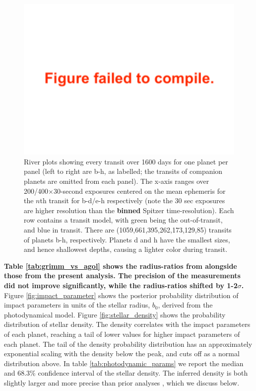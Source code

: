 \documentclass[twocolumn]{aastex63}
\begin{document}
\begin{figure}
    \centering
    \includegraphics[width=\hsize]{figures/T1_riverplot.pdf}
    {River plots showing every transit over 1600 days for one planet per panel
        (left to right are b-h, as labelled; the
        transits of companion planets are omitted from each panel).
        The x-axis ranges over 200/400${\times}$30-second exposures centered on the mean ephemeris for the $n$th transit
        for b-d/e-h respectively (note the 30 sec exposures are higher resolution than the \textbf{binned} Spitzer time-resolution).
        Each row contains a transit model, with green being the out-of-transit, and blue in
        transit.  There are (1059,661,395,262,173,129,85) transits of planets b-h, respectively.
        Planets d and h have the smallest sizes, and hence shallowest depths, causing a lighter
        color during transit.}
    \label{fig:riverplot}
\end{figure}

\textbf{Table \ref{tab:grimm_vs_agol} shows the radius-ratios from \citet{Delrez2018a}
alongside those from the present analysis.  The precision of the measurements did
not improve significantly, while the radius-ratios shifted by 1-2$\sigma$.}
Figure \ref{fig:impact_parameter} shows the posterior probability distribution of impact
parameters in units of the stellar radius, $b_0$, derived from the photodynamical
model.  Figure \ref{fig:stellar_density} shows the probability distribution of stellar
density.  The density correlates with the impact
parameters of each planet, reaching a tail of lower values
for higher impact parameters of each planet.  The tail of the density probability
distribution has an approximately exponential scaling with the density below the
peak, and cuts off as a normal distribution above.  In table \ref{tab:photodynamic_params}
we report the median and 68.3\% confidence interval
of the stellar density.  The inferred density is both slightly larger and more precise
than prior analyses \citep{Delrez2018a}, which we discuss below.
\end{document}
